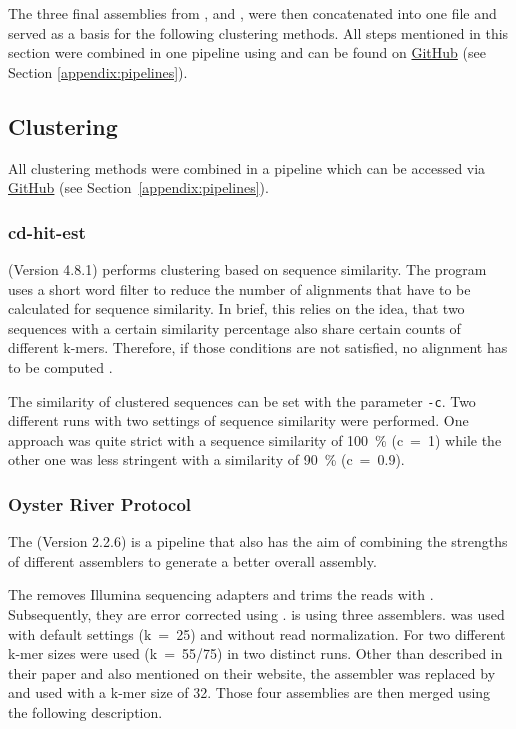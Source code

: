 \documentclass[12pt,a4paper,english]{article}
\begin{document}
	\noindent
	The three final assemblies from \spades, \soap and \trinity, were then concatenated into one file and served as a basis for the following clustering methods. All steps mentioned in this section were combined in one pipeline using \snakemake and can be found on \href{https://github.com/lmfaber/multi_assembly}{GitHub} (see Section \ref{appendix:pipelines}).

\subsection{Clustering}
	All clustering methods were combined in a \snakemake pipeline which can be accessed via \href{https://github.com/lmfaber/clustering}{GitHub} (see Section~\ref{appendix:pipelines}).
	
\subsubsection*{cd-hit-est}
	\cdhit (Version 4.8.1) \citep{cd-hit:06, cd-hit:12} performs clustering based on sequence similarity. The program uses a short word filter to reduce the number of alignments that have to be calculated for sequence similarity. In brief, this relies on the idea, that two sequences with a certain similarity percentage also share certain counts of different k-mers. Therefore, if those conditions are not satisfied, no alignment has to be computed \citep{cd-hit:01}.
	
	The similarity of clustered sequences can be set with the parameter \texttt{-c}. Two different runs with two settings of sequence similarity were performed. One approach was quite strict with a sequence similarity of 100~\% (c~=~1) while the other one was less stringent with a similarity of 90~\% (c~=~0.9).

\subsubsection*{Oyster River Protocol}
	The \orp (Version 2.2.6) \citep{OysterRiverProtocol:18} is a pipeline that also has the aim of combining the strengths of different assemblers to generate a better overall assembly.
	
	The \orp removes Illumina sequencing adapters and trims the reads with \trim \citep{Trimmomatic:14}. Subsequently, they are error corrected using \rcorrector \citep{RCorrector:15}.
	\citeauthor{OysterRiverProtocol:18} is using three assemblers. \trinity was used with default settings (k~=~25) and without read normalization. For \spades two different k-mer sizes were used (k~=~55/75) in two distinct runs. Other than described in their paper and also mentioned on their website, the assembler \shannon \citep{Shannon:16} was replaced by \transabyss \citep{Trans-ABySS:10} and used with a k-mer size of 32. Those four assemblies are then merged using the following description.
	
\end{document}
